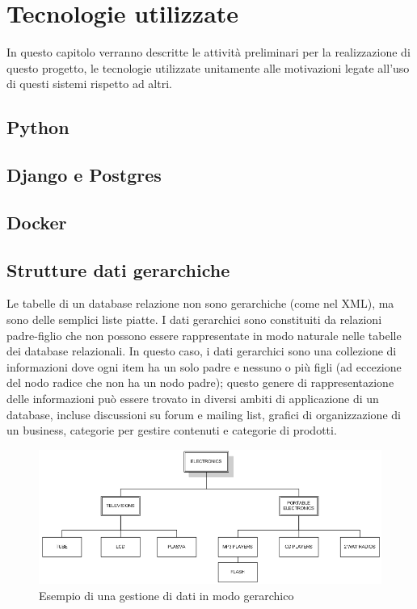 \chapter{Tecnologie utilizzate}
In questo capitolo verranno descritte le attività preliminari per la realizzazione di questo progetto, le tecnologie utilizzate
unitamente alle motivazioni legate all'uso di questi sistemi rispetto ad altri.



\section{Python}

\section{Django e Postgres}

\section{Docker}

\section{Strutture dati gerarchiche}
Le tabelle di un database relazione non sono gerarchiche (come nel XML), ma sono delle semplici liste piatte. I dati gerarchici sono 
constituiti da relazioni padre-figlio che non possono essere rappresentate in modo naturale nelle tabelle dei database relazionali.
In questo caso, i dati gerarchici sono una collezione di informazioni dove ogni item ha un solo padre e nessuno o più figli
(ad eccezione del nodo radice che non ha un nodo padre); questo genere di rappresentazione delle informazioni può essere trovato in 
diversi ambiti di applicazione di un database, incluse discussioni su forum e mailing list, grafici di organizzazione di un business, 
categorie per gestire contenuti e categorie di prodotti. \\

\newpage

\begin{figure}[H]
	\includegraphics[scale=0.7]{images/Hierarchical_Data_ex.PNG}
	\caption{Esempio di una gestione di dati in modo gerarchico}
	\label{fig:Hde}
\end{figure}

